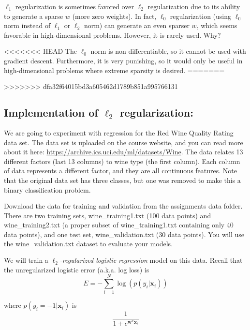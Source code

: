 \problem[4]
$\ell_1$ regularization is sometimes favored over $\ell_2$ regularization due to its ability to generate a sparse $w$ (more zero weights).
In fact, $\ell_0$ regularization (using $\ell_0$ norm instead of $\ell_1$ or $\ell_2$ norm) can generate an even sparser $w$, which seems favorable in high-dimensional problems.
However, it is rarely used.  Why?

\begin{solution}
<<<<<<< HEAD
  The $\ell_0$ norm is non-differentiable, so it cannot be used with gradient descent. Furthermore, it is very punishing, so it would only be useful in high-dimensional problems where extreme sparsity is desired.
=======

>>>>>>> dfa32f64015bd3a605462d1789b851a995766131
\end{solution}

\subsection{Implementation of \texorpdfstring{$\ell_2$}{L2} regularization:}

We are going to experiment with regression for the Red Wine Quality Rating data set. The data set is uploaded on the course website, and you can read more about it here: \url{https://archive.ics.uci.edu/ml/datasets/Wine}. The data relates 13 different factors (last 13 columns) to wine type (the first column). Each column of data represents a different factor, and they are all continuous features. Note that the original data set has three classes, but one was removed to make this a binary classification problem.

Download the data for training and validation from the assignments data folder.
There are two training sets, wine\_training1.txt (100 data points) and wine\_training2.txt (a proper subset of wine\_training1.txt containing only 40 data points), and one test set, wine\_validation.txt (30 data points). You will use the wine\_validation.txt dataset to evaluate your models.

We will train a \emph{$\ell_2$-regularized logistic regression} model on this data. Recall that the unregularized logistic error (a.k.a. log loss) is
\[E = -\sum_{i=1}^{N}\log(p(y_i | \mathbf{x}_i))\]

where $p(y_i = -1 | \mathbf{x}_i)$ is
\[\frac{1}{1 + e^{\mathbf{w}^T\mathbf{x}_i}}\]

